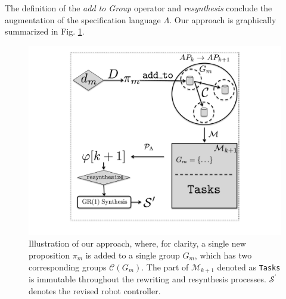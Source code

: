 The definition of the \emph{add to Group} operator and \emph{resynthesis} conclude the augmentation of the specification language $\Lambda$. Our approach is graphically summarized in Fig. \ref{Fig:approach}.

\begin{figure}[h]
	\centering
	\includegraphics[width=0.9\columnwidth, clip]{./img/approach.pdf}
	\caption{Illustration of our approach, where, for clarity, a single new proposition $\pi_{m}$ is added to a single group $G_m$, which has two corresponding groups $\mathcal{C}(G_m)$. The part of $\mathcal{M}_{k+1}$ denoted as \texttt{Tasks} is immutable throughout the rewriting and resynthesis processes. $\mathcal{S}^\prime$ denotes the revised robot controller.} %
	\label{Fig:approach}
\end{figure}
